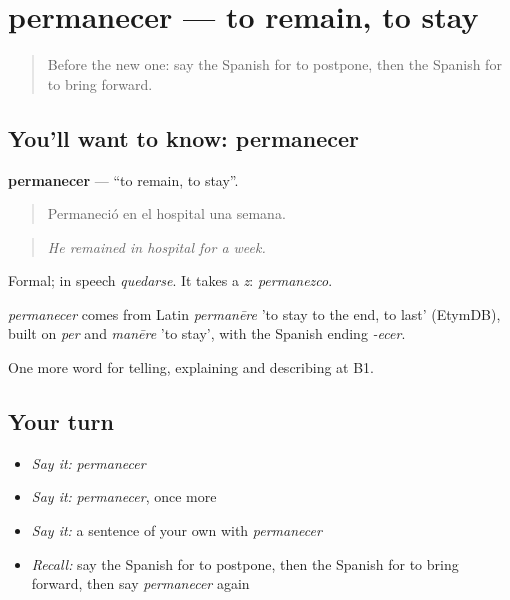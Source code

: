 \section[permanecer]{permanecer — to remain, to stay}

\label{lesson:ES-C543-permanecer}



\begin{quote}
Before the new one: say the Spanish for to postpone, then the Spanish for to bring forward.
\end{quote}

\subsection*{You'll want to know: permanecer}
\textbf{permanecer} — \textquotedblleft{}to remain, to stay\textquotedblright{}.

\begin{quote}
Permaneció en el hospital una semana.
\end{quote}

\begin{quote}
\emph{He remained in hospital for a week.}
\end{quote}

Formal; in speech \emph{quedarse}. It takes a \emph{z}: \emph{permanezco}.

\begin{cousinweb}
\emph{permanecer} comes from Latin \emph{permanēre} 'to stay to the end, to last' (EtymDB), built on \emph{per} and \emph{manēre} 'to stay', with the Spanish ending \emph{-ecer}.
\end{cousinweb}

\begin{grammarlens}[title={What you've built}]
One more word for telling, explaining and describing at B1.
\end{grammarlens}

\subsection*{Your turn}
\begin{itemize}
\raggedright
  \item \emph{Say it:} \emph{permanecer}
  \item \emph{Say it:} \emph{permanecer}, once more
  \item \emph{Say it:} a sentence of your own with \emph{permanecer}
  \item \emph{Recall:} say the Spanish for to postpone, then the Spanish for to bring forward, then say \emph{permanecer} again
\end{itemize}

